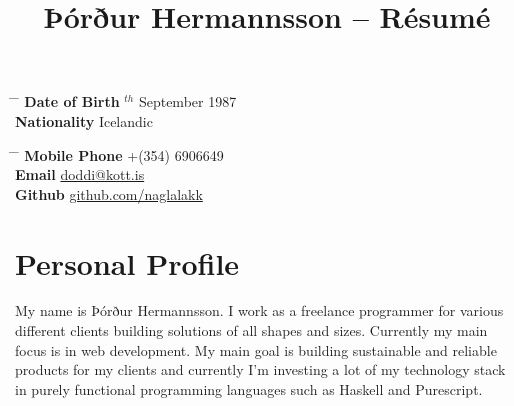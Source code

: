 \documentclass[10pt]{article} %
\begin{document}

\title{Þórður Hermannsson -- Résumé} %


\parbox{0.5\textwidth}{ %
\begin{tabbing} %
\hspace{3cm} \= \hspace{4cm} \= \kill %
{\bf Date of Birth} $^{th}$ September 1987\\ %
{\bf Nationality} \> Icelandic %
\end{tabbing}}
\hfill %
\parbox{0.5\textwidth}{ %
\begin{tabbing} %
\hspace{3cm} \= \hspace{4cm} \= \kill %
{\bf Mobile Phone} \> +(354) 6906649 \\ %
{\bf Email} \> \href{mailto:doddi@kott.is}{doddi@kott.is} \\ %
{\bf Github} \> \href{https://github.com/naglalakk}{github.com/naglalakk} \\ %
\end{tabbing}}


\section{Personal Profile}

My name is Þórður Hermannsson. I work as a freelance programmer for various different clients building solutions of all shapes and sizes. Currently my main focus is in web development. My main goal is building sustainable and reliable products for my clients and currently I'm investing a lot of my technology stack in purely functional programming languages such as Haskell and Purescript. 

\end{document}
